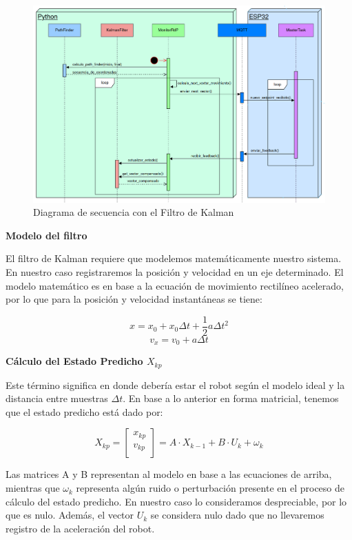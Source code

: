\begin{figure}[H]
    \centering
    \hspace*{-1.1cm}
    \includegraphics[width=1.15\linewidth]{images/diag_secuencia_filtro_de_kalman_con_esp32.png}
    \caption{Diagrama de secuencia con el Filtro de Kalman}
    \label{fig:diagsecuenciafiltrokalman}
\end{figure}


\textbf{Modelo del filtro} \mbox{} \vspace{10pt}

El filtro de Kalman requiere que modelemos matemáticamente nuestro sistema. En nuestro caso registraremos la posición y velocidad en un eje determinado. El modelo matemático es en base a la ecuación de movimiento rectilíneo acelerado, por lo que para la posición y velocidad instantáneas se tiene:

$$ x = x_0 + x_0 \Delta t + \frac{1}{2} a \Delta t^2 $$
$$ v_x = v_0 + a\Delta t $$

\textbf{Cálculo del Estado Predicho $X_{kp}$} \mbox{} \vspace{10pt}

Este término significa en donde debería estar el robot según el modelo ideal y la distancia entre muestras $\Delta t$. En base a lo anterior en forma matricial, tenemos que el estado predicho está dado por:

$$ X_{kp} =
    \begin{bmatrix} x_{kp} \\ v_{kp} \\ \end{bmatrix}
    =
    A \cdot X_{k-1} + B \cdot U_k + \omega_k
$$

Las matrices A y B representan al modelo en base a las ecuaciones de arriba, mientras que $\omega_k$ representa algún ruido o perturbación presente en el proceso de cálculo del estado predicho. En nuestro caso lo consideramos despreciable, por lo que es nulo. Además, el vector $U_k$ se considera nulo dado que no llevaremos registro de la aceleración del robot.

